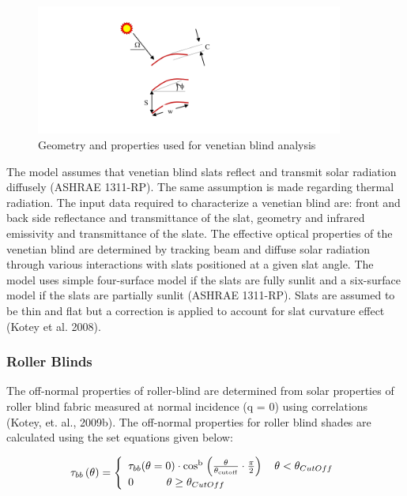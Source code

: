 \begin{figure}[hbtp] %
\centering
\includegraphics[width=0.9\textwidth, height=0.9\textheight, keepaspectratio=true]{media/image1846.svg.png}
\caption{Geometry and properties used for venetian blind analysis \protect \label{fig:geometry-and-properties-used-for-venetian}}
\end{figure}

The model assumes that venetian blind slats reflect and transmit solar radiation diffusely (ASHRAE 1311-RP). The same assumption is made regarding thermal radiation. The input data required to characterize a venetian blind are: front and back side reflectance and transmittance of the slat, geometry and infrared emissivity and transmittance of the slate. The effective optical properties of the venetian blind are determined by tracking beam and diffuse solar radiation through various interactions with slats positioned at a given slat angle. The model uses simple four-surface model if the slats are fully sunlit and a six-surface model if the slats are partially sunlit (ASHRAE 1311-RP). Slats are assumed to be thin and flat but a correction is applied to account for slat curvature effect (Kotey et al. 2008).

\subsubsection{Roller Blinds}\label{roller-blinds}

The off-normal properties of roller-blind are determined from solar properties of roller blind fabric measured at normal incidence (q = 0) using correlations (Kotey, et. al., 2009b). The off-normal properties for roller blind shades are calculated using the set equations given below:

\begin{equation}
{{\rm{\tau }}_{bb}}\left( {\rm{\theta }} \right) = \left\{ \begin{array}{l}{{\rm{\tau }}_{bb}}{\rm{(\theta }} = {\rm{0)}} \cdot {\rm{co}}{{\rm{s}}^{\rm{b}}}{\kern 1pt} \left( {\frac{{\rm{\theta }}}{{{{\rm{\theta }}_{{\rm{cutoff}}}}}} \cdot \frac{\pi }{2}} \right)\quad \theta  < {\theta_{CutOff}}\\0\quad \quad \quad \theta  \ge {\theta_{CutOff}}\end{array} \right.
\end{equation}

